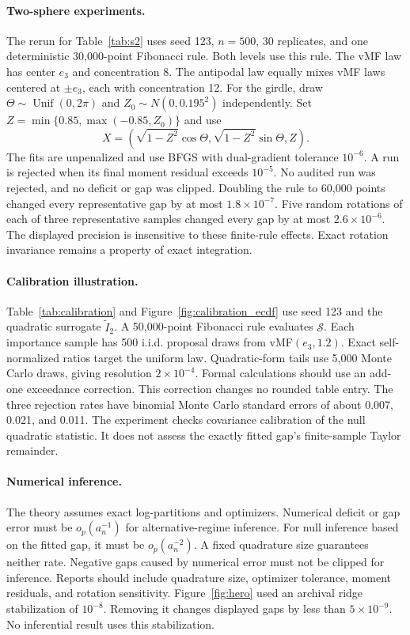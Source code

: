 \documentclass[twoside]{article}
\theoremstyle{definition}
\theoremstyle{remark}
\begin{document}
\paragraph{Two-sphere experiments.}
The rerun for Table~\ref{tab:s2} uses seed 123, $n=500$, 30 replicates, and one deterministic 30,000-point Fibonacci rule. Both levels use this rule. The vMF law has center $e_3$ and concentration 8. The antipodal law equally mixes vMF laws centered at $\pm e_3$, each with concentration 12. For the girdle, draw $\Theta\sim\operatorname{Unif}(0,2\pi)$ and $Z_0\sim N(0,0.195^2)$ independently. Set $Z=\min\{0.85,\max(-0.85,Z_0)\}$ and use
\[
 X=(\sqrt{1-Z^2}\cos\Theta,\sqrt{1-Z^2}\sin\Theta,Z).
\]
The fits are unpenalized and use BFGS with dual-gradient tolerance $10^{-6}$. A run is rejected when its final moment residual exceeds $10^{-5}$. No audited run was rejected, and no deficit or gap was clipped. Doubling the rule to 60,000 points changed every representative gap by at most $1.8\times10^{-7}$. Five random rotations of each of three representative samples changed every gap by at most $2.6\times10^{-6}$. The displayed precision is insensitive to these finite-rule effects. Exact rotation invariance remains a property of exact integration.

\paragraph{Calibration illustration.}
Table~\ref{tab:calibration} and Figure~\ref{fig:calibration_ecdf} use seed 123 and the quadratic surrogate $\widetilde I_2$. A 50,000-point Fibonacci rule evaluates $\mathcal S$. Each importance sample has 500 i.i.d. proposal draws from vMF$(e_3,1.2)$. Exact self-normalized ratios target the uniform law. Quadratic-form tails use 5,000 Monte Carlo draws, giving resolution $2\times10^{-4}$. Formal calculations should use an add-one exceedance correction. This correction changes no rounded table entry. The three rejection rates have binomial Monte Carlo standard errors of about 0.007, 0.021, and 0.011. The experiment checks covariance calibration of the null quadratic statistic. It does not assess the exactly fitted gap's finite-sample Taylor remainder.

\paragraph{Numerical inference.}
The theory assumes exact log-partitions and optimizers. Numerical deficit or gap error must be $o_p(a_n^{-1})$ for alternative-regime inference. For null inference based on the fitted gap, it must be $o_p(a_n^{-2})$. A fixed quadrature size guarantees neither rate. Negative gaps caused by numerical error must not be clipped for inference. Reports should include quadrature size, optimizer tolerance, moment residuals, and rotation sensitivity. Figure~\ref{fig:hero} used an archival ridge stabilization of $10^{-8}$. Removing it changes displayed gaps by less than $5\times10^{-9}$. No inferential result uses this stabilization.
\end{document}
